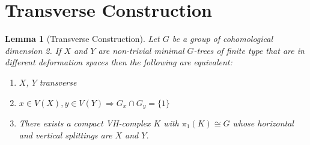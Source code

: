\documentclass[12pt,parskip=full]{report}
\theoremstyle{plain}
\newtheorem{lem}[thm]{Lemma}
\theoremstyle{definition}
\begin{document}
\section{Transverse Construction}
\begin{lem}
    [Transverse Construction]
    \label{pro:transverseconstruction} 
 Let $G$ be a group of cohomological dimension 2. If $X$ and $Y$ are non-trivial minimal $G$-trees of finite type that are in different deformation spaces then the following are equivalent:
\begin{enumerate}
    \item $X$, $Y$ transverse
    \item $x \in V(X), y\in V(Y)\Longrightarrow G_x\cap G_y = \{1\}$
    \item There exists a compact VH-complex $K$ with $\pi_1(K) \cong G$ whose horizontal and vertical splittings are $X$ and $Y$.
\end{enumerate}
\end{lem}
\end{document}
